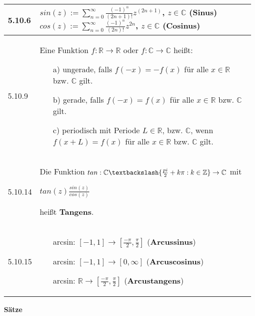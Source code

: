     \begin{longtable}{p{1cm} p{16cm}}
        \toprule

        5.10.6& $sin(z) := \sum^{\infty}_{n=0} \frac{(-1)^n}{(2n+1)!} z^(2n+1)$, $z \in \mathbb{C}$ (\textbf{Sinus}) \hfill \break
                $cos(z) := \sum^{\infty}_{n=0} \frac{(-1)^n}{(2n)!}z^{2n}$, $z \in \mathbb{C}$ (\textbf{Cosinus}) \\
        \midrule
        5.10.9& Eine Funktion $f: \mathbb{R} \rightarrow \mathbb{R}$ oder $f: \mathbb{C} \rightarrow \mathbb{C}$ heißt: 
                \begin{itemize}[topsep=-0.5cm]
                    \item[a)] ungerade, falls $f(-x) = -f(x)$ für alle $x \in \mathbb{R}$ bzw. $\mathbb{C}$ gilt.
                    \item[b)] gerade, falls $f(-x) = f(x)$ für alle $x \in \mathbb{R}$ bzw. $\mathbb{C}$ gilt.
                    \item[c)] periodisch mit Periode $L \in \mathbb{R}$, bzw. $\mathbb{C}$, wenn $f(x+L) = f(x)$ für alle $x \in \mathbb{R}$ bzw. $\mathbb{C}$ gilt.
                \end{itemize} \vspace{-0cm}\\
        \midrule
        5.10.14&Die Funktion $tan: \mathbb{C} \textbackslash \{\frac{pi}{2}+k\pi:k \in \mathbb{Z}\} \rightarrow \mathbb{C}$ mit \hfill \break
                \centerline{$tan(z) \frac{sin(z)}{cos(z)}$}
                heißt \textbf{Tangens}. \\
        \midrule
        5.10.15&\begin{itemize}[topsep=-0.5cm]
                    \item[] arcsin: $[-1,1] \rightarrow [\frac{-\pi}{2},\frac{\pi}{2}]$ (\textbf{Arcussinus})
                    \item[] arcsin: $[-1,1] \rightarrow [0, \infty]$ (\textbf{Arcuscosinus})
                    \item[] arcsin: $\mathbb{R} \rightarrow [\frac{-\pi}{2},\frac{\pi}{2}]$ (\textbf{Arcustangens})
                \end{itemize} \vspace{-0cm} \\

        \bottomrule

    \end{longtable}
    

    

    \noindent 
    \textbf{Sätze}
    
